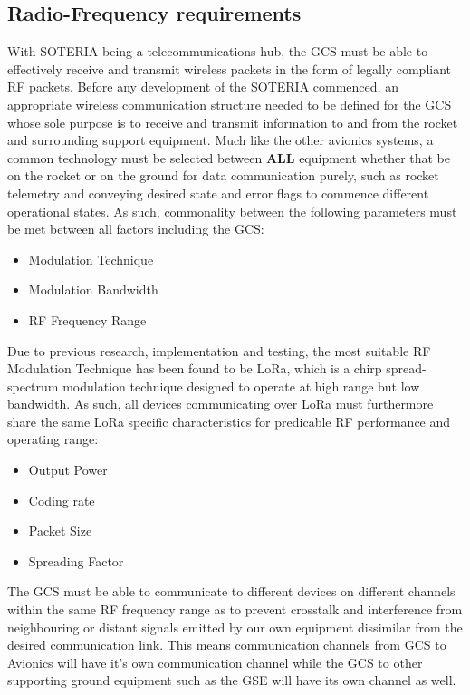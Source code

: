 \subsection{Radio-Frequency requirements}
With SOTERIA being a telecommunications hub, the GCS must be able to effectively receive and transmit wireless packets in the form of legally compliant RF packets. Before any development of the SOTERIA commenced, an appropriate wireless communication structure needed to be defined for the GCS whose sole purpose is to receive and transmit information to and from the rocket and surrounding support equipment. 
Much like the other avionics systems, a common technology must be selected between \textbf{ALL} equipment whether that be on the rocket or on the ground for data communication purely, such as rocket telemetry and conveying desired state and error flags to commence different operational states. As such, commonality between the following parameters must be met between all factors including the GCS:
\begin{itemize}
    \item Modulation Technique
    \item Modulation Bandwidth
    \item RF Frequency Range
\end{itemize}
Due to previous research, implementation and testing, the most suitable RF Modulation Technique has been found to be LoRa, which is  a chirp spread-spectrum modulation technique designed to operate at high range but low bandwidth. As such, all devices communicating over LoRa must furthermore share the same LoRa specific characteristics for predicable RF performance and operating range:
\begin{itemize}
    \item Output Power
    \item Coding rate
    \item Packet Size
    \item Spreading Factor
\end{itemize}
The GCS must be able to communicate to different devices on different channels within the same RF frequency range as to prevent crosstalk and interference from neighbouring or distant signals emitted by our own equipment dissimilar from the desired communication link. This means communication channels from GCS to Avionics will have it's own communication channel while the GCS to other supporting ground equipment such as the GSE will have its own channel as well. 
\break
